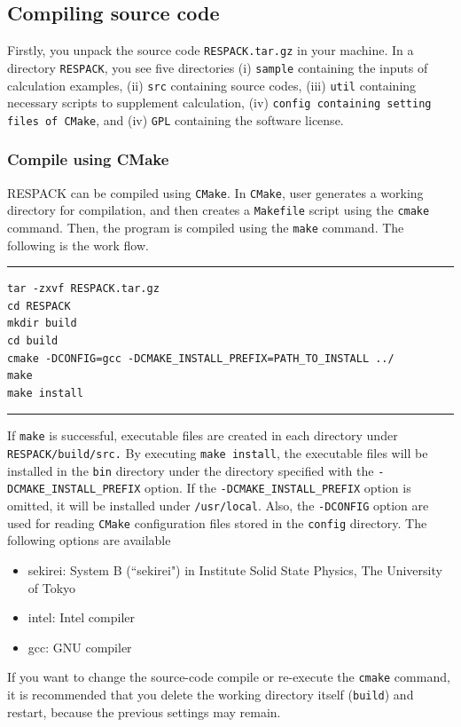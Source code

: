 \documentclass{article}
\begin{document}
\subsection{\label{compile}Compiling source code}

Firstly, you unpack the source code \verb+RESPACK.tar.gz+ in your machine. In a directory \verb+RESPACK+, you see five directories (i) \verb+sample+ containing the inputs of calculation examples, (ii) \verb+src+ containing source codes, (iii) \verb+util+ containing necessary scripts to supplement calculation, (iv) {\tt config containing setting files of {\tt CMake}}, and (iv) {\tt GPL} containing the software license. 

\subsubsection{Compile using CMake}
RESPACK can be compiled using {\tt CMake}. In {\tt CMake}, user generates a working directory for compilation, and then creates a {\tt Makefile} script using the {\tt cmake} command. Then, the program is compiled using the {\tt make} command. The following is the work flow. 
\vspace{3mm}\hrule
\begin{verbatim}
tar -zxvf RESPACK.tar.gz
cd RESPACK
mkdir build
cd build
cmake -DCONFIG=gcc -DCMAKE_INSTALL_PREFIX=PATH_TO_INSTALL ../
make
make install
\end{verbatim}
\hrule\vspace{3mm}
If {\tt make} is successful, executable files are created in each directory under {\tt RESPACK/build/src.} By executing {\tt make install}, the executable files will be installed in the {\tt bin} directory under the directory specified with the {\tt -DCMAKE\_INSTALL\_PREFIX} option. If the {\tt -DCMAKE\_INSTALL\_PREFIX} option is omitted, it will be installed under {\tt /usr/local}. Also, the {\tt -DCONFIG} option are used for reading {\tt CMake} configuration files stored in the {\tt config} directory. The following options are available 
\begin{itemize}
    \item sekirei: System B (``sekirei") in Institute Solid State Physics, The University of Tokyo
    \item intel: Intel compiler 
    \item gcc: GNU compiler
\end{itemize}
If you want to change the source-code compile or re-execute the {\tt cmake} command, it is recommended that you delete the working directory itself ({\tt build}) and restart, because the previous settings may remain. 
\end{document}
